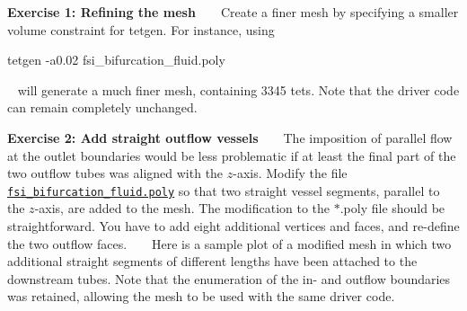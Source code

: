 \begin{DoxyItemize}
\item {\bfseries Exercise 1\+: Refining the mesh} ~\newline
~\newline
 Create a finer mesh by specifying a smaller volume constraint for tetgen. For instance, using ~\newline
 ~\newline

\begin{DoxyCode}
tetgen -a0.02 fsi\_bifurcation\_fluid.poly
\end{DoxyCode}
 ~\newline
 will generate a much finer mesh, containing 3345 tets. Note that the driver code can remain completely unchanged. ~\newline
~\newline

\item {\bfseries Exercise 2\+: Add straight outflow vessels} ~\newline
~\newline
 The imposition of parallel flow at the outlet boundaries would be less problematic if at least the final part of the two outflow tubes was aligned with the $ z $-\/axis. Modify the file {\ttfamily \href{../../../../demo_drivers/navier_stokes/unstructured_three_d_fluid/fsi_bifurcation_fluid.poly}{\tt fsi\+\_\+bifurcation\+\_\+fluid.\+poly} } so that two straight vessel segments, parallel to the $ z $-\/axis, are added to the mesh. The modification to the {\ttfamily $\ast$.poly} file should be straightforward. You have to add eight additional vertices and faces, and re-\/define the two outflow faces. ~\newline
~\newline
 Here is a sample plot of a modified mesh in which two additional straight segments of different lengths have been attached to the downstream tubes. Note that the enumeration of the in-\/ and outflow boundaries was retained, allowing the mesh to be used with the same driver code. ~\newline
~\newline
 

\end{DoxyItemize}
